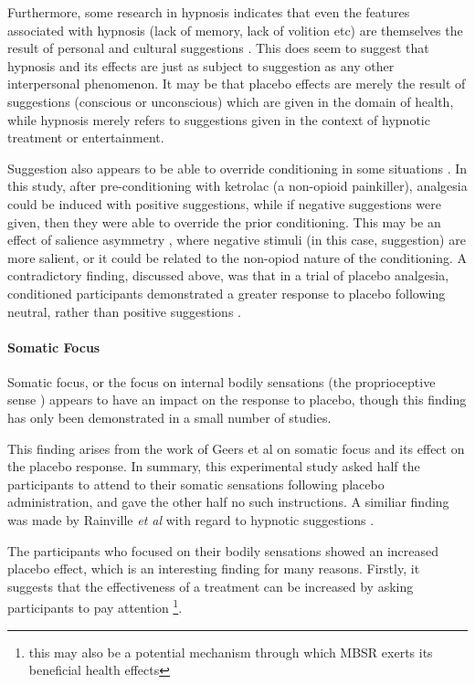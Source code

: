 Furthermore, some research in hypnosis indicates that even the features associated with hypnosis (lack of memory, lack of volition etc) are themselves the result of personal and cultural suggestions \cite{Kirsch1999}. This does seem to suggest that hypnosis and its effects are just as subject to suggestion as any other interpersonal phenomenon.  It may be that placebo effects are merely the result of suggestions (conscious or unconscious) which are given in the domain of health, while hypnosis merely refers to suggestions given in the context of hypnotic treatment or entertainment. 

Suggestion also appears to be able to override conditioning in some situations \cite{Benedetti2008}. In this study, after pre-conditioning with ketrolac (a non-opioid painkiller), analgesia could be induced with positive suggestions, while if negative suggestions were given, then they were able to override the prior conditioning. This may be an effect of salience asymmetry \cite{Rothermund2004}, where negative stimuli (in this case, suggestion) are more salient, or it could be related to the non-opiod nature of the conditioning. A contradictory finding, discussed above, was that in a trial of placebo analgesia, conditioned participants demonstrated a greater response to placebo following neutral, rather than positive suggestions \cite{Klinger2007a}. 

\paragraph{Somatic Focus}

Somatic focus, or the focus on internal bodily sensations (the proprioceptive sense ) appears to have an impact on the response to placebo, though this finding has only been demonstrated in a small number of studies. 

This finding arises from the work of Geers et al \cite{Geers2006}  on somatic focus and its effect on the placebo response. In summary, this experimental study asked half the participants to attend to their somatic sensations following placebo administration, and gave the other half no such instructions. A similiar finding was made by Rainville \textit{et al} with regard to hypnotic suggestions \cite{Price2008}. 

The participants who focused on their bodily sensations showed an increased placebo effect, which is an interesting finding for many reasons. Firstly, it suggests that the effectiveness of a treatment can be increased by asking participants to pay attention \footnote{this may also be a potential mechanism through which MBSR exerts its beneficial health effects}. 

